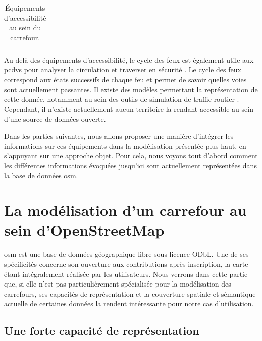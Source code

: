 \begin{table}[ht]
\begin{center}
\begin{tabular}{ | m{2cm} | m{10cm} }
    \end{tabular}
    \end{center}
    \caption[Équipements d'accessibilité d'un carrefour]{Équipements d'accessibilité au sein du carrefour.}
    \label{tab:modelisation_objets}
\end{table}

Au-delà des équipements d'accessibilité, le cycle des feux est également utile aux \glspl{pcdv} pour analyser la circulation et traverser en sécurité \citep{ratelle_manuel_2019}. Le cycle des feux correspond aux états successifs de chaque feu et permet de savoir quelles voies sont actuellement passantes. Il existe des modèles permettant la représentation de cette donnée, notamment au sein des outils de simulation de traffic routier \citep{Lopez2018}. Cependant, il n'existe actuellement aucun territoire la rendant accessible au sein d'une source de données ouverte.

\newpar{}

Dans les parties suivantes, nous allons proposer une manière d'intégrer les informations sur ces équipements dans la modélisation présentée plus haut, en s'appuyant sur une approche objet. Pour cela, nous voyons tout d'abord comment les différentes informations évoquées jusqu'ici sont actuellement représentées dans la base de données \gls{osm}.

\section{La modélisation d’un carrefour au sein d’OpenStreetMap}

\label{sec:modelisation_osm}


\gls{osm} est une base de données géographique libre sous licence ODbL. Une de ses spécificités concerne son ouverture aux contributions après inscription, la carte étant intégralement réalisée par les utilisateurs. Nous verrons dans cette partie que, si elle n'est pas particulièrement spécialisée pour la modélisation des carrefours, ses capacités de représentation et la couverture spatiale et sémantique actuelle de certaines données la rendent intéressante pour notre cas d'utilisation.

\subsection{Une forte capacité de représentation}

